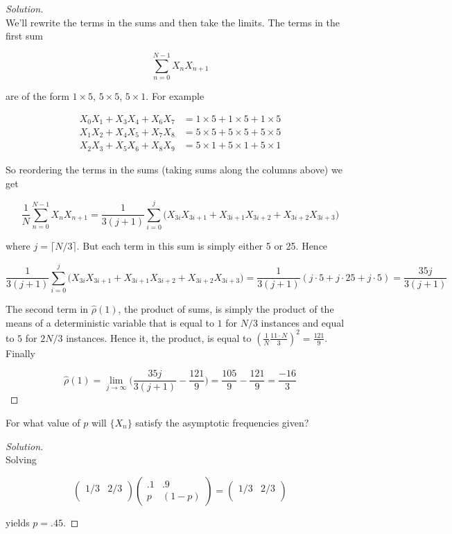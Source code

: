 \documentclass[12pt]{article}
\newenvironment{problem}[2][Problem]{\begin{trivlist}
\item[\hskip \labelsep {\bfseries #1}\hskip \labelsep {\bfseries #2.}]}{\end{trivlist}}
\newenvironment{solution}
  {\begin{proof}[Solution]\renewcommand{\qedsymbol}{}}
  {\end{proof}}
\begin{document}
\begin{solution}\ \\

We'll rewrite the terms in the sums and then take the limits. The terms in the first sum

$$
\sum_{n=0}^{N-1} X_n X_{n+1} 
$$

\noindent are of the form $1 \times 5$, $5 \times 5$, $5 \times 1$. For example

\begin{align*}
X_0 X_1 + X_3 X_4 + X_6 X_7 &= 1\times 5 + 1\times 5 + 1\times 5 \\
X_1 X_2 + X_4 X_5 + X_7 X_8 &= 5\times 5 + 5\times 5 + 5\times 5 \\
X_2 X_3 + X_5 X_6 + X_8 X_9 &= 5\times 1 + 5\times 1 + 5\times 1
\end{align*} 

So reordering the terms in the sums (taking sums along the columns above) we get 

$$
\frac{1}{N} \sum_{n=0}^{N-1} X_n X_{n+1} = \frac{1}{3(j+1)}\sum_{i=0}^j \bigg(X_{3i}X_{3i+1} + X_{3i+1}X_{3i+2} + X_{3i+2}X_{3i+3}\bigg)
$$

where $j = \lceil N/3 \rceil$. But each term in this sum is simply either 5 or 25. Hence 

$$
\frac{1}{3(j+1)}\sum_{i=0}^j \bigg(X_{3i}X_{3i+1} + X_{3i+1}X_{3i+2} + X_{3i+2}X_{3i+3}\bigg) = \frac{1}{3(j+1)}(j\cdot5+j\cdot25+j\cdot5) = \frac{35 j}{3(j+1)} 
$$

The second term in $\hat \rho(1)$, the product of sums, is simply the product of the means of a deterministic variable that is equal to $1$ for $N/3$ instances and equal to $5$ for $2N/3$ instances. Hence it, the product, is equal to $(\frac{1}{N}\frac{11\cdot N}{3})^2 = \frac{121}{9}$. Finally 

$$
\hat \rho(1) = \lim_{j \to \infty} \bigg( \frac{35 j}{3(j+1)} - \frac{121}{9}\bigg) = \frac{105}{9} - \frac{121}{9} = \frac{-16}{3} 
$$

\end{solution}
\begin{problem}{3(a)}
For what value of $p$ will $\{X_n\}$ satisfy the asymptotic frequencies given?
\end{problem}
\begin{solution}\ \\

Solving 

$$
\begin{pmatrix}
1/3 & 2/3\\
\end{pmatrix} 
\begin{pmatrix}
.1 & .9 \\ 
p & (1-p) 
\end{pmatrix}=
\begin{pmatrix}
1/3 & 2/3\\
\end{pmatrix}
$$

yields $p = .45$.
\end{solution}
\end{document}
